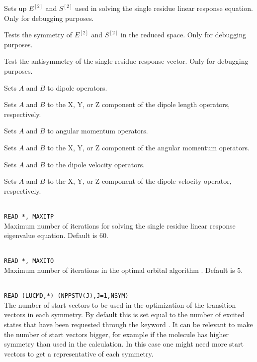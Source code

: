 \begin{description}

\item{} Sets up $E^{\left[2\right]}$
  and $S^{\left[2\right]}$ used in solving the
  single residue linear response equation. Only for debugging purposes.

\item{} Tests the symmetry of $E^{\left[2\right]}$
  and $S^{\left[2\right]}$ in the reduced space.
  Only for debugging purposes.

\item{} Test the antisymmetry of the single residue response
  vector. Only for debugging purposes.

\item{}
Sets $A$ and $B$ to dipole operators.

\item{}
Sets $A$ and $B$ to the X, Y, or Z component of the dipole length operators, respectively.

\item{}
Sets $A$ and $B$ to angular momentum operators.

\item{}
Sets $A$ and $B$ to the X, Y, or Z component of the angular momentum operators.

\item{}
Sets $A$ and $B$ to the dipole velocity operators.

\item{}
Sets $A$ and $B$ to the X, Y, or Z component of the dipole velocity
operator, respectively.

\item{}\\
\verb|READ *, MAXITP|\\
Maximum number of iterations for solving the single residue
linear response eigenvalue equation. Default is 60.

\item{}\\
\verb|READ *, MAXITO|\\
Maximum number of iterations in the optimal orbital
algorithm
\cite{tuhjahjajpjjcp84}.
Default is 5.

\item{}\\
\verb|READ (LUCMD,*) (NPPSTV(J),J=1,NSYM)|\\
 The number of start vectors to be used in the
  optimization of the transition vectors in each symmetry. By default
  this is set equal to the number of excited states that have been
  requested through the keyword .
  It can be relevant to make the number of start vectors bigger,
  for example if the molecule has higher symmetry than used in the
  calculation. In this case one might need more start vectors to
  get a representative of each symmetry.



\end{description}
